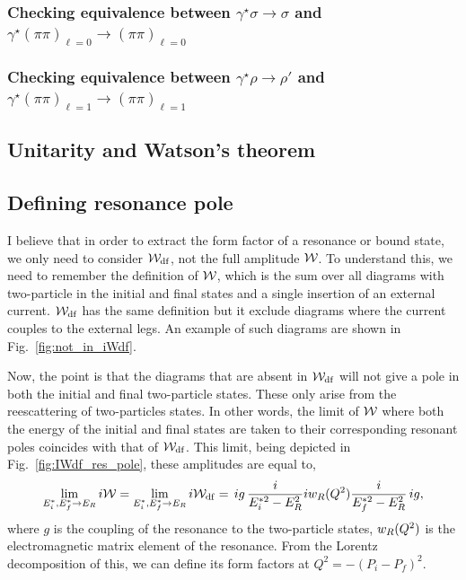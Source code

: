 \subsubsection{Checking equivalence between $\gamma^\star\sigma\to\sigma$ and $\gamma^\star(\pi\pi)_{\ell=0}\to(\pi\pi)_{\ell=0}$}
\subsubsection{Checking equivalence between $\gamma^\star\rho\to\rho'$ and $\gamma^\star(\pi\pi)_{\ell=1}\to(\pi\pi)_{\ell=1}$}



  \subsection{Unitarity and Watson's theorem}
  


  \subsection{Defining resonance pole}
I believe that in order to extract the form factor of a resonance or bound state, we only need to consider ${\mathcal{W}}_{\rm df}$, not the full amplitude ${\mathcal{W}}$. To understand this, we need to remember the definition of ${\mathcal{W}}$, which is the sum over all diagrams with two-particle in the initial and final states and a single insertion of an external current. ${\mathcal{W}}_{\rm df}$ has the same definition but it exclude diagrams where the current couples to the external legs. An example of such diagrams are shown in Fig.~\ref{fig:not_in_iWdf}. 

Now, the point is that the diagrams that are absent in ${\mathcal{W}}_{\rm df}$ will not give a pole in both the initial and final two-particle states. These only arise from the reescattering of two-particles states. In other words, the limit of ${\mathcal{W}}$ where both the energy of the initial and final states are taken to their corresponding resonant poles coincides with that of ${\mathcal{W}}_{\rm df}$. This limit, being depicted in Fig.~\ref{fig:IWdf_res_pole}, these amplitudes are equal to,
\begin{align}
\lim_{E_i^*,E_f^*\to E_R}i{\mathcal{W}}=\lim_{E_i^*,E_f^*\to E_R}i{\mathcal{W}}_{\rm df}=
 \,{ig}\,\frac{i}{E_i^{*2}-E_R^2} iw_R(Q^2)\frac{i}{E_f^{*2}-E_R^2}\,{ig},
\end{align}
where $g$ is the coupling of the resonance to the two-particle states, $w_R(Q^2)$ is the electromagnetic matrix element of the resonance. From the Lorentz decomposition of this, we can define its form factors at $Q^2=-(P_i-P_f)^2$. 

